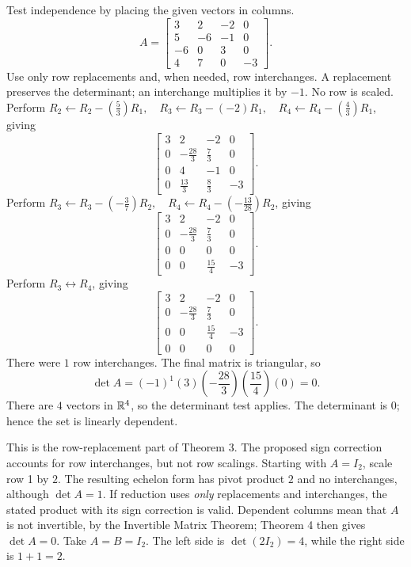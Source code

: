 \goal Test independence by placing the given vectors in columns.
\[A=\begin{bmatrix}3&2&-2&0\\5&-6&-1&0\\-6&0&3&0\\4&7&0&-3\end{bmatrix}.\]
Use only row replacements and, when needed, row interchanges. A replacement preserves the determinant; an interchange multiplies it by $-1$. No row is scaled.
Perform $R_2\leftarrow R_2-(\frac{5}{3})R_1,\quad R_3\leftarrow R_3-(-2)R_1,\quad R_4\leftarrow R_4-(\frac{4}{3})R_1$, giving
\[
\begin{bmatrix}3&2&-2&0\\0&- \frac{28}{3}&\frac{7}{3}&0\\0&4&-1&0\\0&\frac{13}{3}&\frac{8}{3}&-3\end{bmatrix}.
\]
Perform $R_3\leftarrow R_3-(- \frac{3}{7})R_2,\quad R_4\leftarrow R_4-(- \frac{13}{28})R_2$, giving
\[
\begin{bmatrix}3&2&-2&0\\0&- \frac{28}{3}&\frac{7}{3}&0\\0&0&0&0\\0&0&\frac{15}{4}&-3\end{bmatrix}.
\]
Perform $R_3\leftrightarrow R_4$, giving
\[
\begin{bmatrix}3&2&-2&0\\0&- \frac{28}{3}&\frac{7}{3}&0\\0&0&\frac{15}{4}&-3\\0&0&0&0\end{bmatrix}.
\]
There were $1$ row interchanges. The final matrix is triangular, so
\[\det A=(-1)^{1}(3)(- \frac{28}{3})(\frac{15}{4})(0)=0.\]
There are $4$ vectors in $\mathbb{R}^4$, so the determinant test applies. The determinant is $0$; hence the set is linearly dependent.

 This is the row-replacement part of Theorem 3.
 The proposed sign correction accounts for row interchanges, but not row scalings. Starting with $A=I_2$, scale row 1 by $2$. The resulting echelon form has pivot product $2$ and no interchanges, although $\det A=1$. If reduction uses \emph{only} replacements and interchanges, the stated product with its sign correction is valid.
 Dependent columns mean that $A$ is not invertible, by the Invertible Matrix Theorem; Theorem 4 then gives $\det A=0$.
 Take $A=B=I_2$. The left side is $\det(2I_2)=4$, while the right side is $1+1=2$.

